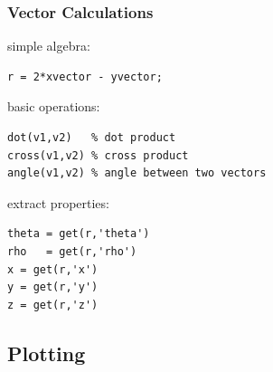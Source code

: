 \begin{frame}[fragile]
  \frametitle{Vector Calculations}


  simple algebra:
\begin{lstlisting}
r = 2*xvector - yvector;
\end{lstlisting}

  \pause \medskip


  basic operations:
\begin{lstlisting}
dot(v1,v2)   % dot product
cross(v1,v2) % cross product
angle(v1,v2) % angle between two vectors
\end{lstlisting}

  \pause \medskip

  extract properties:
\begin{lstlisting}
theta = get(r,'theta')
rho   = get(r,'rho')
x = get(r,'x')
y = get(r,'y')
z = get(r,'z')
\end{lstlisting}

\end{frame}


\subsection*{Plotting}
\label{sec:plotting}

